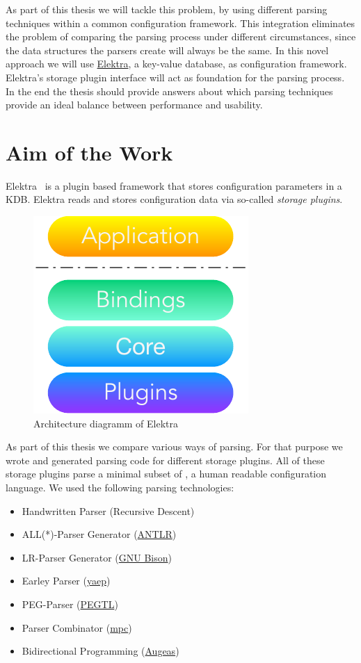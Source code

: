 As part of this thesis we will tackle this problem, by using different parsing techniques within a common configuration framework. This integration eliminates the problem of comparing the parsing process under different circumstances, since the data structures the parsers create will always be the same. In this novel approach we will use \href{http://web.libelektra.org}{Elektra}, a key-value database, as configuration framework. Elektra’s storage plugin interface will act as foundation for the parsing process. In the end the thesis should provide answers about which parsing techniques provide an ideal balance between performance and usability.

\section{Aim of the Work}
\label{sec:aim_of_the_work}

Elektra~\cite{raab2010modular} is a plugin based framework that stores configuration parameters in a \glsdesc{KDB}. Elektra reads and stores configuration data via so-called \emph{storage plugins}.

\begin{figure}[H]
  \centering
    \includegraphics[width=.3\textwidth]{Figures/Elektra.pdf}
  \caption{Architecture diagramm of Elektra}
\end{figure}

As part of this thesis we compare various ways of parsing. For that purpose we wrote and generated parsing code for different storage plugins. All of these storage plugins parse a minimal subset of , a human readable configuration language. We used the following parsing technologies:

\begin{itemize}
  \item Handwritten Parser (Recursive Descent)
  \item ALL(*)-Parser Generator (\href{http://www.antlr.org}{ANTLR})
  \item LR-Parser Generator (\href{https://www.gnu.org/software/bison}{GNU Bison})
  \item Earley Parser (\href{https://github.com/vnmakarov/yaep}{yaep})
  \item PEG-Parser (\href{https://github.com/ColinH/PEGTL}{PEGTL})
  \item Parser Combinator (\href{https://github.com/orangeduck/mpc}{mpc})
  \item Bidirectional Programming (\href{http://augeas.net}{Augeas})
\end{itemize}

